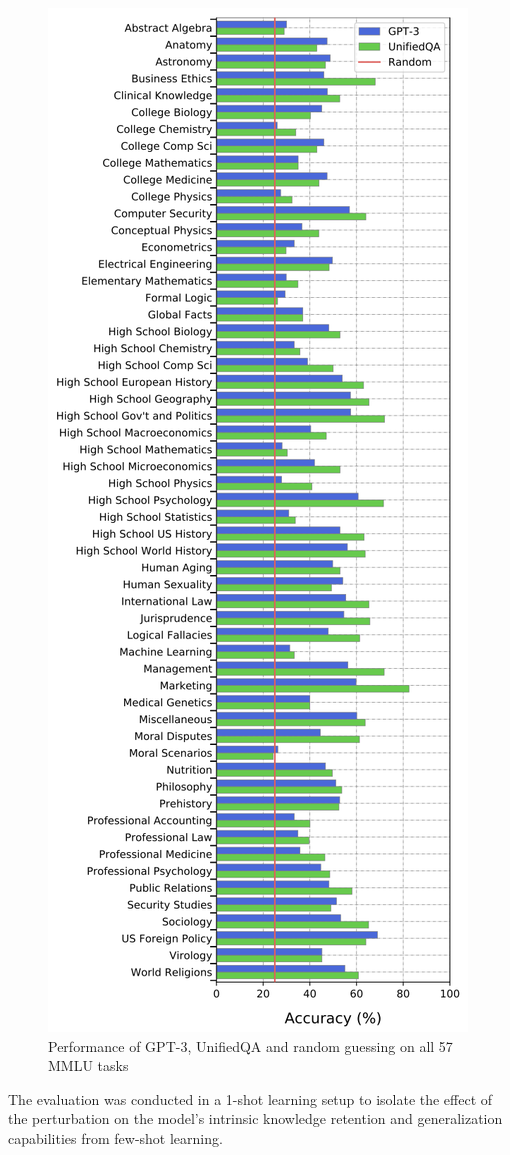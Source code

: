 \begin{figure}
        \centering
        \includegraphics[width=0.75\linewidth]{images/mmlu-task-performance.png}
        \caption{Performance of GPT-3, UnifiedQA and random guessing on all 57 MMLU tasks\cite{hendrycks2021measuringmassivemultitasklanguage}}
        \label{fig:mmlu-tasks}
\end{figure}

The evaluation was conducted in a 1-shot learning setup to isolate the effect of the perturbation on the model's intrinsic knowledge retention and generalization capabilities from few-shot learning. 

